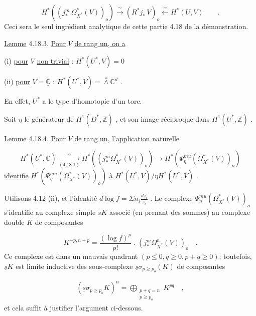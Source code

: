 \begin{equation}\tag{4.18.2}
H^*((j_*^m\, \Omega^*_{X^*}(V))_o) \xrightarrow{\ \sim\ } (R^*j_*\, V)_o \xleftarrow{\ \sim\ } H^*(U, V) \qquad .
\end{equation}
Ceci sera le seul ingrédient analytique de cette partie 4.18 de la démonstration.

\underline{Lemme} 4.18.3. \underline{Pour} $V$ \underline{de rang un, on a}

(i) \qquad \underline{pour} $V$ \underline{non trivial} : $H^*(U^*, V) = 0$



 (ii) \underline{pour} $V = \underline{\mathbb{C}}$ : $H^*(U^*, V) = \stackrel{*}{\wedge} \mathbb{C}^d$ .

En effet, $U^*$ a le type d'homotopie d'un tore.

Soit $\eta$ le générateur de $H^1(D^*, \mathbb{Z})$ , et son image réciproque dans $H^1(U^*, \mathbb{Z})$ .

\underline{Lemme} 4.18.4. \underline{Pour} $V$ \underline{de rang un, l'application naturelle}

\begin{equation*}
H^*(U^*, \mathbb{C}) \xrightarrow[(4.18.1)]{\sim} H^*((j^m_* \Omega^*_{X^*}(V))_o) \longrightarrow H^*(\Psi^{mu}_{\eta}(\Omega^*_{X^*}(V))_o)
\end{equation*}
\underline{identifie} $H^*(\Psi^{mu}_{\eta}(\Omega^*_{X^*}(V))_o)$ \underline{à} $H^*(U^*, V)/\eta H^*(U^*, V)$ .

Utilisons 4.12 (ii), et l'identité $d \log f = \Sigma n_i \frac{dz_i}{z_i}$ . Le complexe $\Psi^{mu}_{\eta}(\Omega^*_{X^*}(V))_o$ s'identifie au complexe simple $\underline{s} K$ associé (en prenant des sommes) au complexe double $K$ de composantes

\begin{equation*}
K^{-p,n+p} = \frac{(\log f)^p}{p!} \; . \; (j^m_* \Omega^n_{X^*}(V))_o \quad .
\end{equation*}
Ce complexe est dans un mauvais quadrant $(p \leqslant 0, q \geqslant 0, p+q \geqslant 0)$; toutefois, $\underline{s} K$ est limite inductive des sous-complexe $\underline{s} \sigma_{p \geqslant p_o}(K)$ de composantes

\begin{multline*}
(\underline{s} \sigma_{p \geqslant p_o} K)^n = \bigoplus_{\substack{p+q=n \\ p \geqslant p_o}} K^{pq} \quad ,
\end{multline*}
et cela suffit à justifier l'argument ci-dessous.

